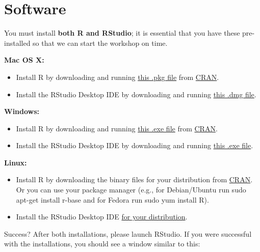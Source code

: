 \documentclass[]{book}
\providecommand{\tightlist}{%
  \setlength{\itemsep}{0pt}\setlength{\parskip}{0pt}}
\begin{document}
\hypertarget{software}{%
\section{Software}\label{software}}

You must install \textbf{both R and RStudio}; it is essential that you have these pre-installed so that we can start the workshop on time.

\textbf{Mac OS X:}

\begin{itemize}
\tightlist
\item
  Install R by downloading and running \href{http://cran.r-project.org/bin/macosx/R-latest.pkg}{this .pkg file} from \href{http://cran.r-project.org/index.html}{CRAN}.
\item
  Install the RStudio Desktop IDE by downloading and running \href{https://download1.rstudio.org/desktop/macos/RStudio-1.2.5033.dmg}{this .dmg file}.
\end{itemize}

\textbf{Windows:}

\begin{itemize}
\tightlist
\item
  Install R by downloading and running \href{https://cran.r-project.org/bin/windows/base/release.htm}{this .exe file} from \href{http://cran.r-project.org/index.html}{CRAN}.
\item
  Install the RStudio Desktop IDE by downloading and running \href{https://https://download1.rstudio.org/desktop/windows/RStudio-1.2.5033.exe}{this .exe file}.
\end{itemize}

\textbf{Linux:}

\begin{itemize}
\tightlist
\item
  Install R by downloading the binary files for your distribution from \href{http://cran.r-project.org/index.html}{CRAN}. Or you can use your package manager (e.g., for Debian/Ubuntu run sudo apt-get install r-base and for Fedora run sudo yum install R).
\item
  Install the RStudio Desktop IDE \href{https://rstudio.com/products/rstudio/download/\#download}{for your distribution}.
\end{itemize}

Success? After both installations, please launch RStudio. If you were successful with the installations, you should see a window similar to this:
\end{document}
